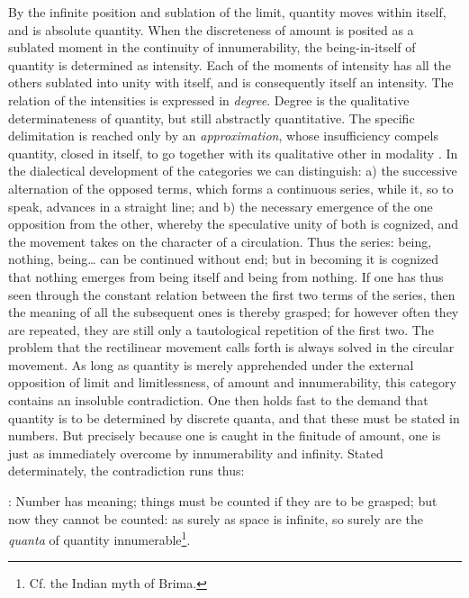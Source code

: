 \documentclass[12pt,a4paper,openany]{book}
\newcommand{\opage}[1]{\marginnote{\footnotesize\textit{[#1]}}}
\begin{document}
By the infinite position and sublation of the limit, quantity moves within itself, and is absolute quantity. When the discreteness of amount is posited as a sublated moment in the continuity of innumerability, the being-in-itself of quantity is determined as intensity. Each of the moments of intensity has all the others sublated into unity with itself, and is consequently itself an intensity. The relation of the intensities is expressed in \emph{degree}. Degree is the qualitative determinateness of quantity, but still abstractly quantitative. The specific delimitation is reached only by an \emph{approximation}, whose insufficiency compels quantity, closed in itself, to go together with its qualitative other in modality
\setcounter{footnote}{0}%
\opage{41}. In the dialectical development of the categories we can distinguish: a) the successive alternation of the opposed terms, which forms a continuous series, while it, so to speak, advances in a straight line; and b) the necessary emergence of the one opposition from the other, whereby the speculative unity of both is cognized, and the movement takes on the character of a circulation. Thus the series: being, nothing, being\dots{} can be continued without end; but in becoming it is cognized that nothing emerges from being itself and being from nothing. If one has thus seen through the constant relation between the first two terms of the series, then the meaning of all the subsequent ones is thereby grasped; for however often they are repeated, they are still only a tautological repetition of the first two. The problem that the rectilinear movement calls forth is always solved in the circular movement. As long as quantity is merely apprehended under the external opposition of limit and limitlessness, of amount and innumerability, this category contains an insoluble contradiction. One then holds fast to the demand that quantity is to be determined by discrete quanta, and that these must be stated in numbers. But precisely because one is caught in the finitude of amount, one is just as immediately overcome by innumerability and infinity. Stated determinately, the contradiction runs thus:

: Number has meaning; things must be counted if they are to be grasped; but now they cannot be counted: as surely as space is infinite, so surely are the \emph{quanta} of quantity innumerable\footnote{Cf. the Indian myth of Brima.}.
\end{document}

